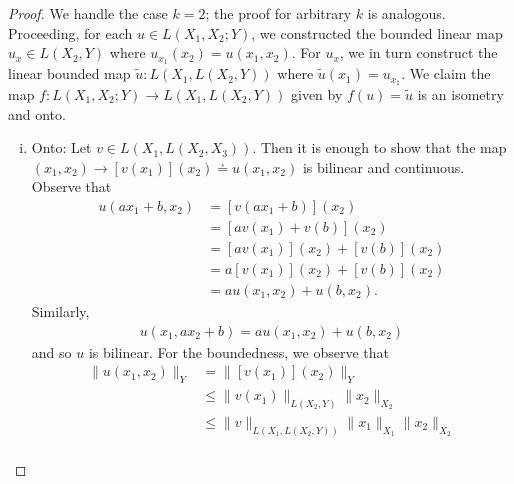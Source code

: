 \documentclass[12pt,reqno]{amsart}
\numberwithin{equation}{section}  %
\begin{document}
\begin{proof}
We handle the case $k=2$; the proof for arbitrary $k$ is analogous. Proceeding,
for each $u \in L(X_{1}, X_{2}; Y)$, we constructed the bounded linear map
$u_{x} \in L(X_{2}, Y)$ where $u_{x_{1}}(x_{2}) = u(x_{1}, x_{2})$. For
$u_{x}$, we in turn construct the linear bounded map $\tilde{u}: L(X_{1},
L(X_{2}, Y))$ where $\tilde{u}(x_{1}) = u_{x_{1}}$. We claim the map $f:
L(X_{1}, X_{2}; Y) \to L(X_{1}, L(X_{2}, Y))$ given by $f(u) = \tilde{u}$ is an
isometry and onto.
\begin{enumerate}[i)]
    \item{}Onto: Let $v \in L(X_{1}, L(X_{2}, X_{3}))$. Then it is enough to
        show that the map $(x_{1}, x_{2}) \to [v(x_{1})](x_{2}) \doteq
        u(x_{1}, x_{2})$ is bilinear and continuous. Observe that
        \begin{equation*}
        \begin{split}
            u(ax_{1} + b, x_{2} )
            & = [v(ax_{1} + b)](x_{2})
            \\
            & = [av(x_{1}) + v(b)](x_{2})
            \\
            & = [av(x_{1})](x_{2}) + [v(b)](x_{2})
            \\
            & = a[v(x_{1})](x_{2}) + [v(b)](x_{2})
            \\
            & = au(x_{1}, x_{2}) + u(b, x_{2}).
        \end{split}
        \end{equation*}
        Similarly, 
        \begin{equation*}
        \begin{split}
            u(x_{1}, ax_{2} + b) = au(x_{1}, x_{2}) + u(b, x_{2})
        \end{split}
        \end{equation*}
        and so $u$ is bilinear. For the boundedness, we observe that
        \begin{equation*}
        \begin{split}
            \| u(x_{1}, x_{2}) \|_{Y} 
            & = \| [v(x_{1})](x_{2}) \|_{Y}
            \\
            & \le \| v(x_{1}) \|_{L(X_{2}, Y)} \| x_{2} \|_{X_{2}}
            \\
            & \le \| v \|_{L(X_{1}, L(X_{2}, Y))} \| x_{1} \|_{X_{1}} \| x_{2}
            \|_{X_{2}}
            \\

\end{split}
\end{equation*}
\end{enumerate}
\end{proof}
\end{document}
